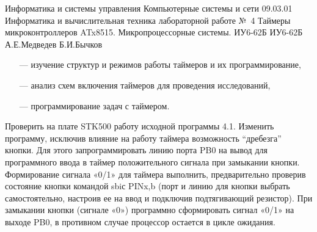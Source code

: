 \documentclass{bmstu}
\begin{document}



\titlespacing*{\chapter}{0pt}{5pt}{0px}

\makeatletter %
\renewcommand\chapter{\par%
\thispagestyle{plain}%
\@afterindentfalse \secdef\@chapter\@schapter}
\makeatother

\def\numberWork{1}


\makereporttitle
    {Информатика и системы управления} %
    {Компьютерные системы и сети} %
    {09.03.01 Информатика и вычислительная техника} %
    {лабораторной работе №~4} %
    {Таймеры микроконтроллеров ATx8515.} %
    {Микропроцессорные системы.} %
    {} %
    {ИУ6-62Б} %
    {
    	{ИУ6-62Б}
    	{А.Е.Медведев} %
    	{Б.И.Бычков} %
    } 
    
\chapter{Цель работы:}

\begin{enumerate}
\item[---] изучение структур и режимов работы таймеров и их программирование, 
\item[---] анализ схем включения таймеров для проведения исследований, 
\item[---] программирование задач с таймером.
\end{enumerate}

\chapter{Задание 1.} 

Проверить на плате STK500 работу исходной программы 4.1. 
Изменить программу, исключив влияние на работу таймера возможность “дребезга” кнопки. Для этого запрограммировать 
линию порта PB0 на вывод для программного ввода в таймер положительного сигнала при замыкании кнопки. Формирование 
сигнала «0/1» для таймера выполнить, предварительно проверив состояние кнопки командой sbiс PINx,b (порт и линию 
для кнопки выбрать самостоятельно, настроив ее на ввод и подключив подтягивающий резистор). При замыкании кнопки 
(сигнале «0») программно сформировать сигнал «0/1» на выходе PB0, в противном случае процессор остается в цикле 
ожидания. 
\end{document}
